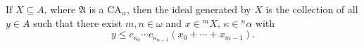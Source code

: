 If $X \subseteq A$, where $\mathfrak{A}$ is a $\mathrm{CA}_{\alpha}$, then the ideal generated by $X$ is the collection of all $y \in A$ such that there exist $m, n \in \omega$ and $x \in {}^{m}X$, $\kappa \in {}^{n}\alpha$ with
$$y \leq c_{\kappa_0} \cdots c_{\kappa_{n-1}}(x_0 + \cdots + x_{m-1}).$$

